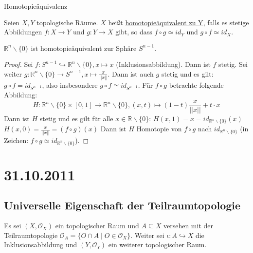 \documentclass[a4paper,11pt,notitlepage]{report}
\theoremstyle{definition}
\newcommand{\R}{{\ensuremath{\mathbb{R}}}}
\newcommand{\OO}{{\ensuremath{\mathcal{O}}}}
\begin{document}
\begin{section}{Homotopieäquivalenz}
	\begin{definition}
		Seien $X,Y$ topologische Räume. $X$ heißt \underline{homotopieäquivalent zu Y}, falls es stetige Abbildungen $f \colon X \rightarrow Y$ und $g \colon Y \rightarrow X$ gibt, so dass $f \circ g \simeq id_Y$ und $g \circ f \simeq id_X$.
	\end{definition}
	
	\begin{theorem}
		$\R^n \backslash \{0\}$ ist homotopieäquivalent zur Sphäre $S^{n-1}$.
	\end{theorem}
	
	\begin{proof}
		Sei $f \colon S^{n-1} \hookrightarrow \R^n \backslash \{0\}, x \mapsto x$ (Inklusionsabbildung). Dann ist $f$ stetig.
		\newline
		Sei weiter $g \colon \R^n \backslash \{0\} \rightarrow S^{n-1}, x \mapsto \frac{x}{||x||}$. Dann ist auch $g$ stetig und es gilt:
		$g \circ f = id_{S^{n-1}}$, also insbesondere $g \circ f \simeq id_{S^{n-1}}$.
		\newline
		Für $f \circ g$ betrachte folgende Abbildung:
		$$H \colon \R^n \backslash \{0\} \times [0,1] \rightarrow \R^n \backslash \{0\}, (x,t) \mapsto (1-t) \frac{x}{||x||} + t \cdot x$$
		Dann ist $H$ stetig und es gilt für alle $x \in \R \backslash \{0\}$:
		\newline
		$H(x,1) = x = id_{\R^n \backslash \{0\}}(x)$
		\newline
		$H(x,0) = \frac{x}{||x||} = (f \circ g)(x)$
		\newline
		Dann ist $H$ Homotopie von $f \circ g$ nach $id_{\R^n \backslash \{0\}}$ (in Zeichen: $f \circ g \simeq id_{\R^n \backslash \{0\}}$).
	\end{proof}
\end{section}

\chapter{31.10.2011}
\section{Universelle Eigenschaft der Teilraumtopologie}
Es sei $(X, \OO_X)$ ein topologischer Raum und $A \subseteq X$ versehen mit der Teilraumtopologie $\OO_A = \{ O \cap A \mid O \in \OO_X \}$. 
Weiter sei $\iota \colon A \hookrightarrow X$ die Inklusionsabbildung und $(Y, \OO_Y)$ ein weiterer topologischer Raum.
\end{document}
